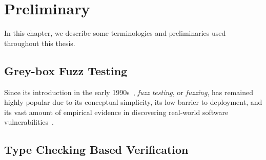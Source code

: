 \chapter{Preliminary} \label{ch:preliminary}

In this chapter, we describe some terminologies and preliminaries used throughout this thesis.

\section{Grey-box Fuzz Testing}
Since its introduction in the early 1990s~\cite{fuzzing1990}, \emph{fuzz testing}, or \emph{fuzzing}, has remained highly popular due to its conceptual simplicity, its low barrier to deployment, and its vast amount of empirical evidence in discovering real-world software vulnerabilities~\cite{fuzz_survey}.

\section{Type Checking Based Verification}
